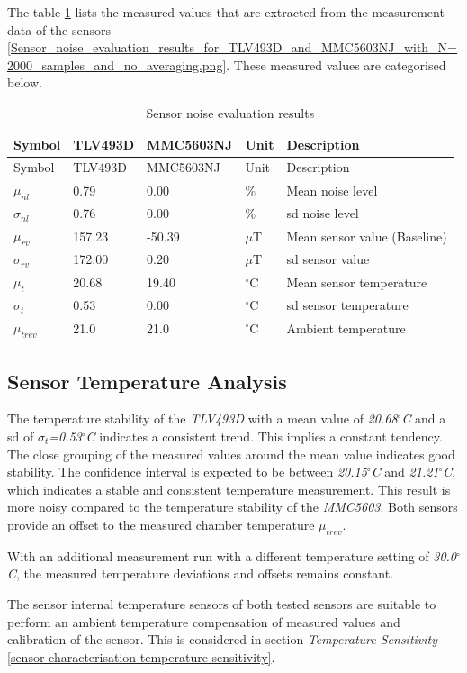 The table \ref{Sensor_noise_evaluation_results.csv} lists the measured
values that are extracted from the measurement data of the sensors
\ref{Sensor_noise_evaluation_results_for_TLV493D_and_MMC5603NJ_with_N=2000_samples_and_no_averaging.png}.
These measured values are categorised below.

\begin{longtable}[]{@{}lllll@{}}
\caption{Sensor noise evaluation results
\label{Sensor_noise_evaluation_results.csv}}\tabularnewline
\toprule
Symbol & TLV493D & MMC5603NJ & Unit & Description\tabularnewline
\midrule
\endfirsthead
\toprule
Symbol & TLV493D & MMC5603NJ & Unit & Description\tabularnewline
\midrule
\endhead
\(\mu_{nl}\) & 0.79 & 0.00 & \% & Mean noise level\tabularnewline
\(\sigma_{nl}\) & 0.76 & 0.00 & \% & \gls{sd} noise level\tabularnewline
\(\mu_{rv}\) & 157.23 & -50.39 & \(\mu\)T & Mean sensor value
(Baseline)\tabularnewline
\(\sigma_{rv}\) & 172.00 & 0.20 & \(\mu\)T & \gls{sd} sensor
value\tabularnewline
\(\mu_{t}\) & 20.68 & 19.40 & \(^{\circ}\)C & Mean sensor
temperature\tabularnewline
\(\sigma_{t}\) & 0.53 & 0.00 & \(^{\circ}\)C & \gls{sd} sensor
temperature\tabularnewline
\(\mu_{trev}\) & 21.0 & 21.0 & \(^{\circ}\)C & Ambient
temperature\tabularnewline
\bottomrule
\end{longtable}

\hypertarget{sensor-temperature-analysis}{%
\subsection{Sensor Temperature
Analysis}\label{sensor-temperature-analysis}}

The temperature stability of the \emph{TLV493D} with a mean value of
\emph{20.68\(^{\circ}\)C} and a \gls{sd} of
\emph{\(\sigma_{t}\)=0.53\(^{\circ}\)C} indicates a consistent trend.
This implies a constant tendency. The close grouping of the measured
values around the mean value indicates good stability. The confidence
interval is expected to be between \emph{20.15\(^{\circ}\)C} and
\emph{21.21\(^{\circ}\)C}, which indicates a stable and consistent
temperature measurement. This result is more noisy compared to the
temperature stability of the \emph{MMC5603}. Both sensors provide an
offset to the measured chamber temperature \(\mu_{trev}\).

With an additional measurement run with a different temperature setting
of \emph{30.0\(^{\circ}\)C}, the measured temperature deviations and
offsets remains constant.

The sensor internal temperature sensors of both tested sensors are
suitable to perform an ambient temperature compensation of measured
values and calibration of the sensor. This is considered in section
\emph{Temperature Sensitivity}
\ref{sensor-characterisation-temperature-sensitivity}.

